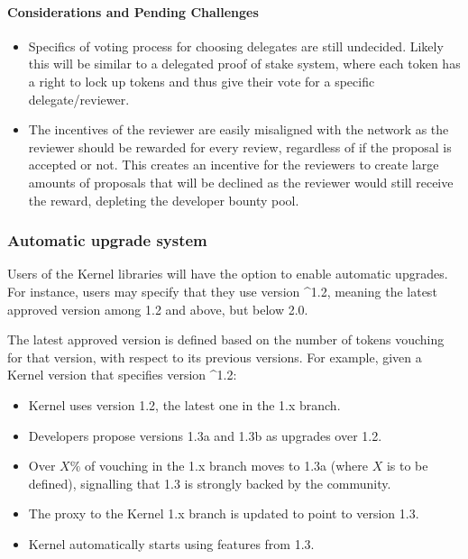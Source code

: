 \documentclass[]{article}
\makeatletter
\let\oldparagraph\paragraph
\renewcommand{\paragraph}[1]{\oldparagraph{#1}\mbox{}}
\DeclareRobustCommand{\_}{%
  \leavevmode\vbox{%
    \hrule\@width.5em
          \@height-.26ex
          \@depth\dimexpr.26ex+.28pt\relax}}
\makeatother
\begin{document}
\paragraph{Considerations and Pending Challenges}

\begin{itemize}
  \item
    Specifics of voting process for choosing delegates are still
    undecided. Likely this will be similar to a delegated proof of stake
    system, where each token has a right to lock up tokens and thus give
    their vote for a specific delegate/reviewer.
  \item
    The incentives of the reviewer are easily misaligned with the network
    as the reviewer should be rewarded for every review, regardless of if
    the proposal is accepted or not. This creates an incentive for the
    reviewers to create large amounts of proposals that will be declined
    as the reviewer would still receive the reward, depleting the
    developer bounty
    pool.
\end{itemize}

\subsubsection{Automatic upgrade system}
\label{autoupgrade}

Users of the Kernel libraries will have the option to enable automatic
upgrades. For instance, users may specify that they use version \^{}1.2,
meaning the latest approved version among 1.2 and above, but below
2.0.

The latest approved version is defined based on the number of
tokens vouching for that version, with respect to its previous versions.
For example, given a Kernel version that specifies version \^{}1.2:

\begin{itemize}
  \item
    Kernel uses version 1.2, the latest one in the 1.x branch.
  \item
    Developers propose versions 1.3a and 1.3b as upgrades over 1.2.
  \item
    Over $X\%$ of vouching in the 1.x branch moves to 1.3a (where $X$ is to
    be defined), signalling that 1.3 is strongly backed by the community.
  \item
    The proxy to the Kernel 1.x branch is updated to point to version 1.3.
  \item
    Kernel automatically starts using features from 1.3.
\end{itemize}
\end{document}
